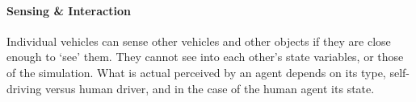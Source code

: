






\paragraph{Sensing \& Interaction} 
Individual vehicles can sense other vehicles and other objects if they are close enough to `see' them. They cannot see into each other's state variables, or those of the simulation. What is actual perceived by an agent depends on its type, self-driving versus human driver, and in the case of the human agent its state. 

